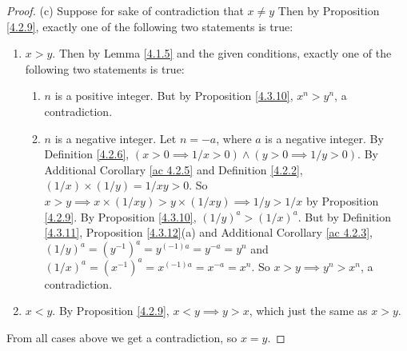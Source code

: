 \begin{proof}{(c)}
    Suppose for sake of contradiction that \(x \neq y\)
    Then by Proposition \ref{4.2.9}, exactly one of the following two statements is true:
    \begin{enumerate}[label=(\Roman*)]
        \item \(x > y\).
              Then by Lemma \ref{4.1.5} and the given conditions, exactly one of the following two statements is true:
              \begin{enumerate}[label=(\roman*)]
                  \item \(n\) is a positive integer.
                        But by Proposition \ref{4.3.10}, \(x^n > y^n\), a contradiction.
                  \item \(n\) is a negative integer.
                        Let \(n = -a\), where \(a\) is a negative integer.
                        By Definition \ref{4.2.6}, \((x > 0 \implies 1 / x > 0) \land (y > 0 \implies 1 / y > 0)\).
                        By Additional Corollary \ref{ac 4.2.5} and Definition \ref{4.2.2}, \((1 / x) \times (1 / y) = 1 / xy > 0\).
                        So \(x > y \implies x \times (1 / xy) > y \times (1 / xy) \implies 1 / y > 1 / x\) by Proposition \ref{4.2.9}.
                        By Proposition \ref{4.3.10}, \((1 / y)^a > (1 / x)^a\).
                        But by Definition \ref{4.3.11}, Proposition \ref{4.3.12}(a) and Additional Corollary \ref{ac 4.2.3}, \((1 / y)^a = (y^{-1})^a = y^{(-1)a} = y^{-a} = y^n\) and \((1 / x)^a = (x^{-1})^a = x^{(-1)a} = x^{-a} = x^n\).
                        So \(x > y \implies y^n > x^n\), a contradiction.
              \end{enumerate}
        \item \(x < y\).
              By Proposition \ref{4.2.9}, \(x < y \implies y > x\), which just the same as \(x > y\).
    \end{enumerate}
    From all cases above we get a contradiction, so \(x = y\).
\end{proof}

